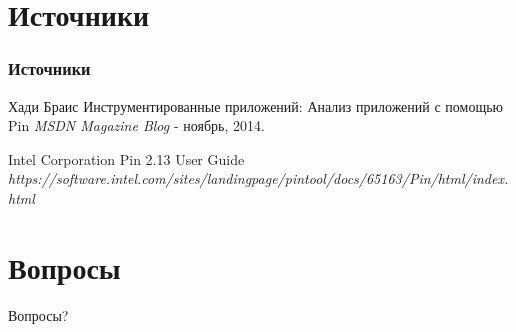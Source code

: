 \documentclass{beamer}
\begin{document}
\section{Источники}

\begin{frame}
\frametitle{Источники}
\footnotesize{
\begin{thebibliography}{99} %
 Хади Браис
\newblock Инструментированные приложений: Анализ приложений с помощью Pin
\newblock \emph{MSDN Magazine Blog} - ноябрь, 2014.
\end{thebibliography}

\begin{thebibliography}{98}
 Intel Corporation
\newblock Pin 2.13 User Guide
\newblock \emph{https://software.intel.com/sites/landingpage/pintool/docs/65163/Pin/html/index.html}
\end{thebibliography}
}
\end{frame}

\section{Вопросы}

\begin{frame}
\Huge{\centerline{Вопросы?}}
\end{frame}

\end{document}
